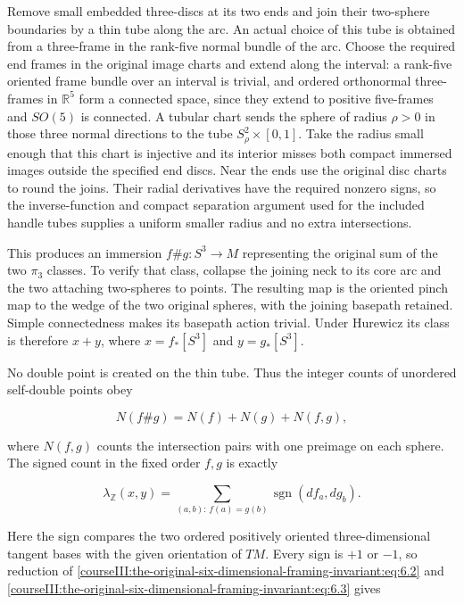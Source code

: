 Remove small embedded three-discs at its two ends and join their two-sphere boundaries by a thin tube along the arc. An actual choice of this tube is obtained from a three-frame in the rank-five normal bundle of the arc. Choose the required end frames in the original image charts and extend along the interval: a rank-five oriented frame bundle over an interval is trivial, and ordered orthonormal three-frames in \(\mathbb R^5\) form a connected space, since they extend to positive five-frames and \(SO(5)\) is connected. A tubular chart sends the sphere of radius \(\rho>0\) in those three normal directions to the tube \(S^2_\rho\times[0,1]\). Take the radius small enough that this chart is injective and its interior misses both compact immersed images outside the specified end discs. Near the ends use the original disc charts to round the joins. Their radial derivatives have the required nonzero signs, so the inverse-function and compact separation argument used for the included handle tubes supplies a uniform smaller radius and no extra intersections.

This produces an immersion \(f\# g:S^3\to M\) representing the original sum of the two \(\pi_3\) classes. To verify that class, collapse the joining neck to its core arc and the two attaching two-spheres to points. The resulting map is the oriented pinch map to the wedge of the two original spheres, with the joining basepath retained. Simple connectedness makes its basepath action trivial. Under Hurewicz its class is therefore \(x+y\), where \(x=f_*[S^3]\) and \(y=g_*[S^3]\).

No double point is created on the thin tube. Thus the integer counts of unordered self-double points obey

\begin{equation}
N(f\# g)=N(f)+N(g)+N(f,g),
 \label{courseIII:the-original-six-dimensional-framing-invariant:eq:6.2}
\end{equation}

where \(N(f,g)\) counts the intersection pairs with one preimage on each sphere. The signed count in the fixed order \(f,g\) is exactly

\begin{equation}
\lambda_{\mathbb Z}(x,y)=
              \sum_{(a,b):\,f(a)=g(b)}\operatorname{sgn}(df_a,dg_b).
 \label{courseIII:the-original-six-dimensional-framing-invariant:eq:6.3}
\end{equation}

Here the sign compares the two ordered positively oriented three-dimensional tangent bases with the given orientation of \(TM\). Every sign is \(+1\) or \(-1\), so reduction of \eqref{courseIII:the-original-six-dimensional-framing-invariant:eq:6.2} and \eqref{courseIII:the-original-six-dimensional-framing-invariant:eq:6.3} gives

